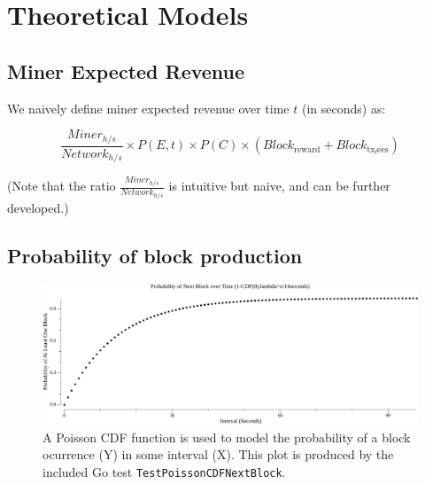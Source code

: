 \documentclass[11pt]{article}
\theoremstyle{plain}
\begin{document}

\pagebreak
\section{\normalsize{Theoretical Models}}\label{sec: theoretical-models}

\subsection{\normalsize{Miner Expected Revenue}}

We naively define miner expected revenue over time $t$ (in seconds) as:

\newcommand{\minerHashrate}{Miner_{h/s}}
\newcommand{\networkHashrate}{Network_{h/s}}
\newcommand{\blockReward}{Block_\mathrm{reward}}
\newcommand{\blockTransactionFees}{Block_\mathrm{tx_fees}}

\begin{equation}
\frac{\minerHashrate}{\networkHashrate}
\times
P(E,t)
\times
P(C)
\times
(\blockReward + \blockTransactionFees)
\end{equation}

(Note that the ratio $\frac{\minerHashrate}{\networkHashrate}$ is intuitive but
naive, and can be further developed.)

\subsection{\normalsize{Probability of block production}}

\begin{figure}[htp]
    \label{go-block-step-cdf-interval}
    \centering
    \includegraphics[width=1.0\textwidth]{go-block-step/out/vis_poisson_cdf_next_in_interval.png}
    \caption{
        A Poisson CDF function is used to model the probability of a block
        ocurrence (Y) in some interval (X).
        This plot is produced by the included Go test
        \texttt{TestPoissonCDFNextBlock}.
    }
\end{figure}
\end{document}
